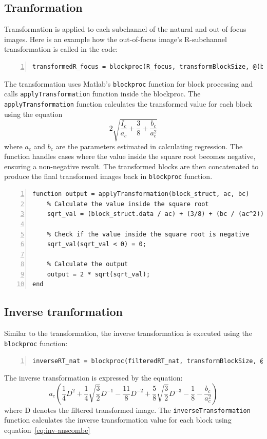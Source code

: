 \documentclass[12pt,a4paper,english
]{tunithesis}
\begin{document}
\subsection{Tranformation}
Transformation is applied to each subchannel of the natural and out-of-focus images. 
 Here is an example how the out-of-focus image's R-subchannel transformation is called in the code:
 \begin{lstlisting}[style=Matlab-editor, numbers=left, basicstyle=\small]
 transformedR_focus = blockproc(R_focus, transformBlockSize, @(block_struct) applyTransformation(block_struct, pR_focus(1), pR_focus(2)));
\end{lstlisting}
The transformation uses Matlab's \texttt{blockproc} function for block processing and calls \texttt{applyTransformation} function inside the blockproc. The \texttt{applyTransformation} function calculates the transformed value for each block using the equation
\begin{equation}
\label{eq:anscombe}
  2 \sqrt{\frac{I_{c}}{a_{c}} + \frac{3}{8} + \frac{b_{c}}{a_{c}^2}}
\end{equation}
 where $a_c$ and $b_c$ are the parameters estimated in calculating regression. The function handles cases where the value inside the square root becomes negative, ensuring a non-negative result. The transformed blocks are then concatenated to produce the final transformed images back in \texttt{blockproc} function.

\begin{lstlisting}[style=Matlab-editor, numbers=left, basicstyle=\small]
% 6. Transformation
function output = applyTransformation(block_struct, ac, bc)
    % Calculate the value inside the square root
    sqrt_val = (block_struct.data / ac) + (3/8) + (bc / (ac^2));

    % Check if the value inside the square root is negative
    sqrt_val(sqrt_val < 0) = 0;

    % Calculate the output
    output = 2 * sqrt(sqrt_val);
end
\end{lstlisting}
\subsection{Inverse tranformation}
Similar to the transformation, the inverse transformation is executed using the \texttt{blockproc} function:
\begin{lstlisting}[style=Matlab-editor, numbers=left, basicstyle=\small]
inverseRT_nat = blockproc(filteredRT_nat, transformBlockSize, @(block_struct) inverseTransformation(block_struct, pR_nat(1), pR_nat(2)));
\end{lstlisting}
The inverse transformation is expressed by the equation:
\begin{equation}
\label{eq:inv-anscombe}
a_c \left( \frac{1}{4} D^2 + \frac{1}{4}\sqrt{\frac{3}{2}}D^{-1} - \frac{11}{8}D^{-2} + \frac{5}{8}\sqrt{\frac{3}{2}}D^{-3} - \frac{1}{8} - \frac{b_c}{a_c^2} \right)
\end{equation}
where D denotes the filtered transformed image. The  \texttt{inverseTransformation} function calculates the inverse transformation value for each block using equation~\ref{eq:inv-anscombe}
\end{document}
